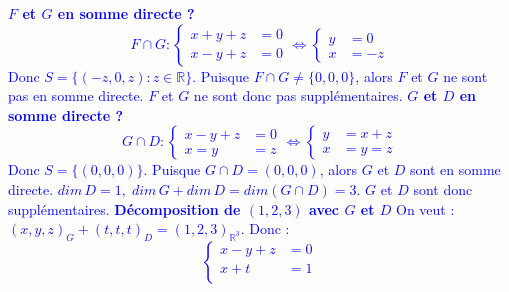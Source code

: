\documentclass[a4paper,12pt]{article}
\def\R{\mathbb{R}}
\newcommand{\add}[1]{\textcolor{blue}{#1}}
\begin{document}
\begin{exercice}
\begin{enumerate}
             \add{
                 {\bf $F$ et $G$ en somme directe ?}\newline
                 $$
                 F\cap G:
                 \left\{
                 \begin{aligned}
                    x+y+z&=0\\
                    x-y+z&=0
                 \end{aligned}
                 \right.
                 \iff
                 \left\{
                 \begin{aligned}
                    y&=0\\
                    x&=-z
                 \end{aligned}
                 \right.
                 $$
                 Donc $S=\{(-z,0,z):z\in\R\}$. Puisque $F\cap G \ne \{0,0,0\}$, alors $F$ et $G$ ne sont pas en somme directe. $F$ et $G$ ne sont donc pas supplémentaires.
                 \newline
                 \newline
                 {\bf $G$ et $D$ en somme directe ?}\newline
                 $$
                 G\cap D:
                 \left\{
                 \begin{aligned}
                    x-y+z&=0\\
                     x=y&=z
                 \end{aligned}
                 \right.
                 \iff
                 \left\{
                 \begin{aligned}
                     y&=x+z\\
                     x&=y=z
                 \end{aligned}
                 \right.
                 $$
                 Donc $S=\{(0,0,0)\}$. Puisque $G\cap D = (0,0,0)$, alors $G$ et $D$ sont en somme directe. $dim\,D=1,\; dim\,G+dim\,D=dim(G\cap D) = 3$. $G$ et $D$ sont donc supplémentaires.
                 \newline
                 \newline
                 {\bf Décomposition de $(1,2,3)$ avec $G$ et $D$}\newline
                 On veut : $(x,y,z)_G + (t,t,t)_D = (1,2,3)_{\R^3}$. Donc :
                 $$
                 \left\{
                 \begin{aligned}
                     x-y+z&=0\\
                     x+t&=1\\

\end{aligned}$$}
\end{enumerate}
\end{exercice}
\end{document}
